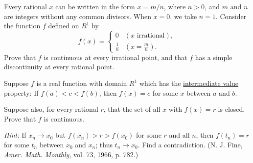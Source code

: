   \begin{exercise}[Rudin 4.18]
    Every rational $x$ can be written in the form $x = m/n$, where $n > 0$, and $m$ and $n$ are integers without any common divisors. When $x = 0$, we take $n = 1$. Consider the function $f$ defined on $R^1$ by
    \begin{equation}
      f(x) = 
      \begin{cases} 
        0 & (x \text{ irrational}), \\ 
        \frac{1}{n} & (x = \frac{m}{n}). 
      \end{cases}
    \end{equation}
    Prove that $f$ is continuous at every irrational point, and that $f$ has a simple discontinuity at every rational point.
  \end{exercise}
  \begin{solution}

  \end{solution}

  \begin{exercise}[Rudin 4.19]
    Suppose $f$ is a real function with domain $R^1$ which has the \hyperref[thm:intermediate-value-theorem]{intermediate value} property: If $f(a) < c < f(b)$, then $f(x) = c$ for some $x$ between $a$ and $b$.
    \par Suppose also, for every rational $r$, that the set of all $x$ with $f(x) = r$ is closed. Prove that $f$ is continuous.
    \par \textit{Hint:} If $x_n \to x_0$ but $f(x_n) > r > f(x_0)$ for some $r$ and all $n$, then $f(t_n) = r$ for some $t_n$ between $x_0$ and $x_n$; thus $t_n \to x_0$. Find a contradiction. (N. J. Fine, \textit{Amer. Math. Monthly}, vol. 73, 1966, p. 782.)
  \end{exercise}
  \begin{solution}

  \end{solution}

